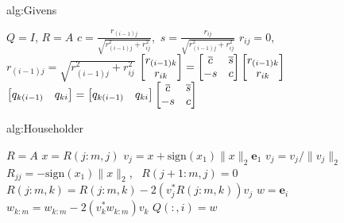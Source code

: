 \begin{alg}{alg:Givens}
    \vspace{-0.3cm}
    \begin{tcolorbox}[colback=white, colframe=gray, arc=0mm] 
        \begin{algorithmic}[1]
            \State $Q = I$, $R = A$
                    \State $c = \frac{r_{(i-1)j}}{\sqrt{r_{(i-1)j}^2 + r_{ij}^2}}$,\ $s = \frac{r_{ij}}{\sqrt{r_{(i-1)j}^2 + r_{ij}^2}}$
                    \State $r_{ij} = 0$, \ $r_{(i-1)j} = \sqrt{r_{(i-1)j}^2 + r_{ij}^2}$
                       \State $\bmatrix r_{(i-1)k} \\ r_{ik} \endbmatrix = \begin{bmatrix} \overline{c} & \overline{s} \\ -s & c \end{bmatrix} \bmatrix r_{(i-1)k} \\ r_{ik} \endbmatrix$
                    \EndFor
                    \State $\bmatrix q_{k(i-1)} & q_{ki}\endbmatrix = \bmatrix q_{k(i-1)} & q_{ki} \endbmatrix \begin{bmatrix} \overline{c} & \overline{s} \\ -s & c \end{bmatrix}$
                 \EndFor
                \EndFor
            \EndFor 
        \end{algorithmic}
    \end{tcolorbox}
    \vspace{-0.3cm}
\end{alg}

\begin{alg}{alg:Householder}
    \vspace{-0.3cm}
    \begin{tcolorbox}[colback=white, colframe=gray, arc=0mm] 
        \begin{algorithmic}[1]
            \State $R = A$
                \State $x= R(j:m,j)$
                \State $v_j = x + \text{sign}(x_1)\|x\|_2 \boldsymbol{e}_1$
                \State $v_j = v_j / \|v_j\|_2$
                \State $R_{jj} = -\text{sign}(x_1)\|x\|_2$, \ $R(j+1:m,j) = 0$
                    \State $R(j:m,k) = R(j:m,k) - 2(v_j^*R(j:m,k))v_j$
                \EndFor
            \EndFor 
                \State $w = \boldsymbol{e}_i$
                    \State $w_{k:m} = w_{k:m} - 2(v_k^*w_{k:m})v_k$
                \EndFor
                \State $Q(:,i) = w$
            \EndFor
        \end{algorithmic}
    \end{tcolorbox}
    \vspace{-0.3cm}
\end{alg}